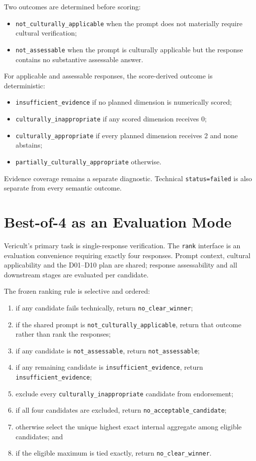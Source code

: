 Two outcomes are determined before scoring:
\begin{itemize}
    \item \texttt{not\_culturally\_applicable} when the prompt does not materially require cultural verification;
    \item \texttt{not\_assessable} when the prompt is culturally applicable but the response contains no substantive assessable answer.
\end{itemize}

For applicable and assessable responses, the score-derived outcome is deterministic:
\begin{itemize}
    \item \texttt{insufficient\_evidence} if no planned dimension is numerically scored;
    \item \texttt{culturally\_inappropriate} if any scored dimension receives 0;
    \item \texttt{culturally\_appropriate} if every planned dimension receives 2 and none abstains;
    \item \texttt{partially\_culturally\_appropriate} otherwise.
\end{itemize}

Evidence coverage remains a separate diagnostic. Technical \texttt{status=failed} is also separate from every semantic outcome.

\section{Best-of-4 as an Evaluation Mode}

Vericult's primary task is single-response verification. The \texttt{rank} interface is an evaluation convenience requiring exactly four responses. Prompt context, cultural applicability and the D01--D10 plan are shared; response assessability and all downstream stages are evaluated per candidate.

The frozen ranking rule is selective and ordered:
\begin{enumerate}
    \item if any candidate fails technically, return \texttt{no\_clear\_winner};
    \item if the shared prompt is \texttt{not\_culturally\_applicable}, return that outcome rather than rank the responses;
    \item if any candidate is \texttt{not\_assessable}, return \texttt{not\_assessable};
    \item if any remaining candidate is \texttt{insufficient\_evidence}, return \texttt{insufficient\_evidence};
    \item exclude every \texttt{culturally\_inappropriate} candidate from endorsement;
    \item if all four candidates are excluded, return \texttt{no\_acceptable\_candidate};
    \item otherwise select the unique highest exact internal aggregate among eligible candidates; and
    \item if the eligible maximum is tied exactly, return \texttt{no\_clear\_winner}.
\end{enumerate}

